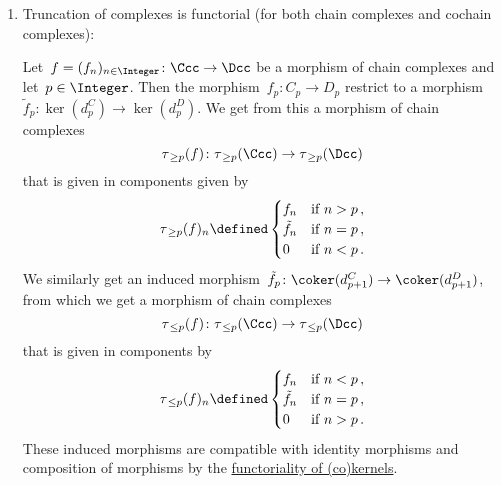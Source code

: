 \begin{remark}
  \leavevmode
  \begin{enumerate}
    \item
      Truncation of complexes is functorial (for both chain complexes and cochain complexes):
      
      Let~$f = (f_n)_{n \in \Integer} \colon \Ccc \to \Dcc$ be a morphism of chain complexes and let~$p \in \Integer$.
      Then the morphism~$f_p \colon C_p \to D_p$ restrict to a morphism~$\tilde{f}_p \colon \ker(d^C_p) \to \ker(d^D_p)$. 
      We get from this a morphism of chain complexes
      \[
                \tau_{\,\geq p}(f)
        \colon  \tau_{\,\geq p}(\Ccc)
        \to     \tau_{\,\geq p}(\Dcc)
      \]
      that is given in components given by
      \[
                  \tau_{\,\geq p}(f)_n
        \defined  \begin{cases}
                    f_n         & \text{if~$n > p$} \,, \\
                    \tilde{f}_n & \text{if~$n = p$} \,, \\
                    0           & \text{if~$n < p$} \,.
                  \end{cases}
      \]
      We similarly get an induced morphism~$\tilde{f}_p \colon \coker(d^C_{p+1}) \to \coker(d^D_{p+1})$, from which we get a morphism of chain complexes
      \[
                \tau_{\,\leq p}(f)
        \colon  \tau_{\,\leq p}(\Ccc)
        \to     \tau_{\,\leq p}(\Dcc)
      \]
      that is given in components by
      \[
                  \tau_{\,\leq p}(f)_n
        \defined  \begin{cases}
                    f_n         & \text{if~$n < p$} \,, \\
                    \tilde{f}_n & \text{if~$n = p$} \,, \\
                    0           & \text{if~$n > p$} \,.
                  \end{cases}
      \]
      These induced morphisms are compatible with identity morphisms and composition of morphisms by the \hyperref[functoriality of (co)kernel]{functoriality of (co)kernels}.
      

\end{enumerate}
\end{remark}
